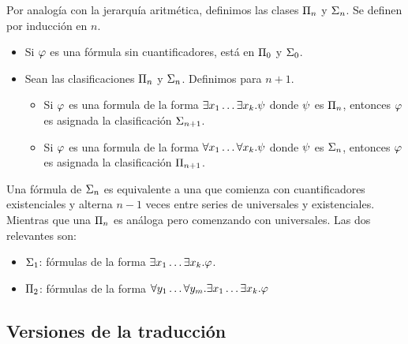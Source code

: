 \begin{definition}
    Por analogía con la jerarquía aritmética, definimos las clases $\Pi_{n}$ y $\Sigma_{n}$. Se definen por inducción en $n$.

    \begin{itemize}
        \item Si $\varphi$ es una fórmula sin cuantificadores, está en
              $\Pi_{0}$ y $\Sigma_{0}$.
        \item Sean las clasificaciones $\Pi_{n}$ y $\Sigma_{n}$. Definimos para $n+1$.
              \begin{itemize}
                  \item Si $\varphi$ es una formula de la forma $\exists
                            x_1 \dots \exists x_k. \psi$ donde $\psi$ es
                        $\Pi_{n}$, entonces $\varphi$ es asignada la clasificación $\Sigma_{n+1}$.

                  \item Si $\varphi$ es una formula de la forma $\forall
                            x_1 \dots \forall x_k. \psi$ donde $\psi$ es
                        $\Sigma_{n}$, entonces $\varphi$ es asignada la clasificación $\Pi_{n+1}$.
              \end{itemize}
    \end{itemize}

    Una fórmula de $\Sigma_{n}$ es equivalente a una que comienza con
    cuantificadores existenciales y alterna $n-1$ veces entre series de
    universales y existenciales. Mientras que una $\Pi_{n}$ es análoga pero
    comenzando con universales. Las dos relevantes son:
    \begin{itemize}
        \item $\Sigma_{1}$: fórmulas de la forma $\exists x_1 \dots
                  \exists x_k . \varphi$.
        \item $\Pi_{2}$: fórmulas de la forma $\forall y_1 \dots \forall y_m . \exists x_1 \dots \exists x_k . \varphi$
    \end{itemize}
\end{definition}

\subsection{Versiones de la traducción}

